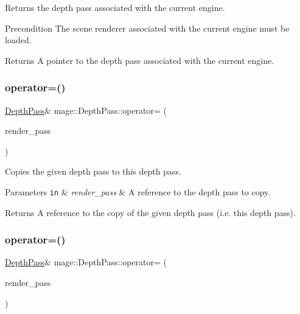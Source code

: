 Returns the depth pass associated with the current engine.

\begin{DoxyPrecond}{Precondition}
The scene renderer associated with the current engine must be loaded. 
\end{DoxyPrecond}
\begin{DoxyReturn}{Returns}
A pointer to the depth pass associated with the current engine. 
\end{DoxyReturn}
\hypertarget{classmage_1_1_depth_pass_ac84074238d8ce69251fc2e6f294c5898}{}\label{classmage_1_1_depth_pass_ac84074238d8ce69251fc2e6f294c5898} 
\subsubsection{\texorpdfstring{operator=()}{operator=()}\hspace{0.1cm}{\footnotesize\ttfamily [1/2]}}
{\footnotesize\ttfamily \hyperlink{classmage_1_1_depth_pass}{Depth\+Pass}\& mage\+::\+Depth\+Pass\+::operator= (\begin{DoxyParamCaption}\item[{const \hyperlink{classmage_1_1_depth_pass}{Depth\+Pass} \&}]{render\+\_\+pass }\end{DoxyParamCaption})\hspace{0.3cm}{\ttfamily [delete]}}

Copies the given depth pass to this depth pass.


\begin{DoxyParams}[1]{Parameters}
\mbox{\tt in}  & {\em render\+\_\+pass} & A reference to the depth pass to copy. \\
\hline
\end{DoxyParams}
\begin{DoxyReturn}{Returns}
A reference to the copy of the given depth pass (i.\+e. this depth pass). 
\end{DoxyReturn}
\hypertarget{classmage_1_1_depth_pass_ab6a7d2abf0876f84591328d448ac1203}{}\label{classmage_1_1_depth_pass_ab6a7d2abf0876f84591328d448ac1203} 
\subsubsection{\texorpdfstring{operator=()}{operator=()}\hspace{0.1cm}{\footnotesize\ttfamily [2/2]}}
{\footnotesize\ttfamily \hyperlink{classmage_1_1_depth_pass}{Depth\+Pass}\& mage\+::\+Depth\+Pass\+::operator= (\begin{DoxyParamCaption}\item[{\hyperlink{classmage_1_1_depth_pass}{Depth\+Pass} \&\&}]{render\+\_\+pass }\end{DoxyParamCaption})\hspace{0.3cm}{\ttfamily [delete]}}

